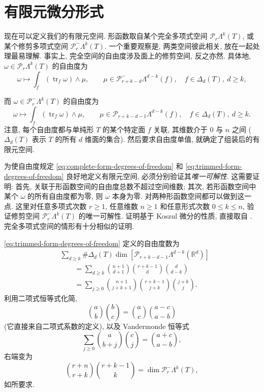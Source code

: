 \section{{有限元微分形式}}\label{sec:finite-element-differential-forms}

{现在可以定义我们的有限元空间. 形函数取自某个完全多项式空间 $\mathcal P_r\Lambda^k(T)$, 或某个修剪多项式空间 $\mathcal P_r^-\Lambda^k(T)$. 一个重要观察是, 两类空间彼此相关, 放在一起处理最易理解. 事实上, 完全空间的自由度涉及面上的修剪空间, 反之亦然. 具体地, $\omega\in\mathcal P_r\Lambda^k(T)$ 的自由度为}
\begin{equation}\label{eq:complete-form-degrees-of-freedom}
\omega\mapsto\int_f(\operatorname{tr}_f\omega)\wedge\mu,\qquad\mu\in\mathcal P_{r+k-d}^-\Lambda^{d-k}(f),\quad f\in\Delta_d(T),\ d\geq k,
\end{equation}

{而 $\omega\in\mathcal P_r^-\Lambda^k(T)$ 的自由度为}
\begin{equation}\label{eq:trimmed-form-degrees-of-freedom}
\omega\mapsto\int_f(\operatorname{tr}_f\omega)\wedge\mu,\qquad\mu\in\mathcal P_{r+k-d-1}\Lambda^{d-k}(f),\quad f\in\Delta_d(T),\ d\geq k.
\end{equation}
{注意, 每个自由度都与单纯形 $T$ 的某个特定面 $f$ 关联, 其维数介于 $0$ 与 $n$ 之间 ($\Delta_d(T)$ 表示 $T$ 的所有 $d$ 维面的集合). 然后要求自由度单值, 就确定了组装后的有限元空间.}

{为使自由度规定 \eqref{eq:complete-form-degrees-of-freedom} 和 \eqref{eq:trimmed-form-degrees-of-freedom} 良好地定义有限元空间, 必须分别验证其\emph{唯一可解性}. 这需要证明: 首先, 关联于形函数空间的自由度总数不超过空间维数; 其次, 若形函数空间中某个 $\omega$ 的所有自由度都为零, 则 $\omega$ 本身为零. 对两种形函数空间都可以做到这一点. 这里对任意多项式次数 $r\geq1$, 任意维数 $n\geq1$ 和任意形式次数 $0\leq k\leq n$, 验证修剪空间 $\mathcal P_r^-\Lambda^k(T)$ 的唯一可解性. 证明基于 Koszul 微分的性质, 直接取自 . 完全多项式空间的情形有十分相似的证明.}

{\eqref{eq:trimmed-form-degrees-of-freedom} 定义的自由度数为}
\[
\begin{aligned}
&\sum_{d\geq k}\#\Delta_d(T)\dim[\mathcal P_{r+k-d-1}\Lambda^{d-k}(\mathbb R^d)]\\
&\qquad=\sum_{d\geq k}\binom{n+1}{d+1}\binom{r+k-1}d\binom d{d-k}\\
&\qquad=\sum_{j\geq0}\binom{n+1}{j+k+1}\binom{r+k-1}{j+k}\binom{j+k}j.
\end{aligned}
\]
{利用二项式恒等式化简,}
\[
\binom ab\binom bc=\binom ac\binom{a-c}{a-b}
\]
{(它直接来自二项式系数的定义), 以及 Vandermonde 恒等式}
\[
\sum_{j\geq0}\binom a{b+j}\binom cj=\binom{a+c}{a-b},
\]
{右端变为}
\[
\binom{r+n}{r+k}\binom{r+k-1}k=\dim\mathcal P_r^-\Lambda^k(T),
\]
{如所要求.}

